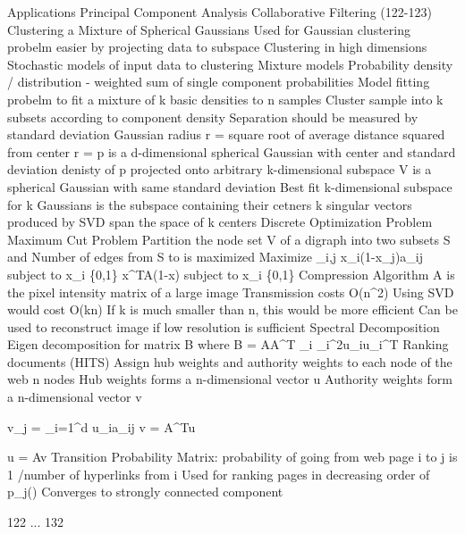 Applications
	Principal Component Analysis
		Collaborative Filtering (122-123)
	Clustering a Mixture of Spherical Gaussians
		Used for Gaussian clustering probelm easier by projecting data to subspace
		Clustering in high dimensions
			Stochastic models of input data to clustering
				Mixture models
					Probability density / distribution - weighted sum of single component probabilities
		Model fitting probelm to fit a mixture of k basic densities to n samples
			Cluster sample into k subsets according to component density
				Separation should be measured by standard deviation
				Gaussian radius r = square root of average distance squared from center
					r = \sigma
				p is a d-dimensional spherical Gaussian with center \mu and standard deviation \sigma
					denisty of p projected onto arbitrary k-dimensional subspace V is a spherical Gaussian with same standard deviation
				Best fit k-dimensional subspace for k Gaussians is the subspace containing their cetners
					k singular vectors produced by SVD span the space of k centers
	Discrete Optimization Problem
		Maximum Cut Problem
			Partition the node set V of a digraph into two subsets S and 
			Number of edges from S to  is maximized
				Maximize \sum_{i,j} x_{i}(1-x_{j})a_{ij} subject to x_{i} \in \{0,1\}
					x^{T}A(1-x) subject to x_{i} \in \{0,1\}
	Compression Algorithm
		A is the pixel intensity matrix of a large image
		Transmission costs O(n^{2})
		Using SVD would cost O(kn)
			If k is much smaller than n, this would be more efficient
				Can be used to reconstruct image if low resolution is sufficient
	Spectral Decomposition
		Eigen decomposition for matrix B where B = AA^{T}
			\sum_{i} \sigma_{i}^{2}u_{i}u_{i}^{T}
	Ranking documents (HITS)
		Assign hub weights and authority weights to each node of the web
		n nodes
			Hub weights forms a n-dimensional vector u
			Authority weights form a n-dimensional vector v

			v_{j} = \sum_{i=1}^{d} u_{i}a_{ij}
			v = A^{T}u

			u = Av
		Transition Probability Matrix: probability of going from web page i to j is 1 /number of hyperlinks from i
			Used for ranking pages in decreasing order of p_{j}(\inf)
			Converges to strongly connected component


122 ... 132